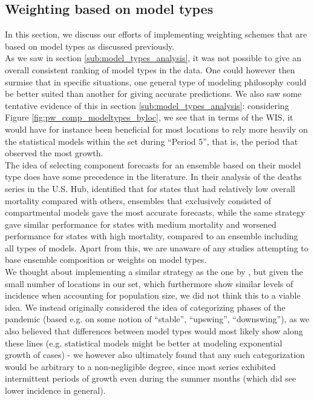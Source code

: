 \subsection{Weighting based on model types} \label{sub:weighting_based_on_model_types}
In this section, we discuss our efforts of implementing weighting schemes that are based on model types as discussed previously.\\
As we saw in section \ref{sub:model_types_analysis}, it was not possible to give an overall consistent ranking of model types in the data. One could however then surmise that in specific situations, one general type of modeling philosophy could be better suited than another for giving accurate predictions. We also saw some tentative evidence of this in section \ref{sub:model_types_analysis}: considering Figure \ref{fig:pw_comp_modeltypes_byloc}, we see that in terms of the WIS, it would have for instance been beneficial for most locations to rely more heavily on the statistical models within the set during ``Period 5'', that is, the period that observed the most growth.\\
The idea of selecting component forecasts for an ensemble based on their model type does have some precedence in the literature. In their analysis of the deaths series in the U.S. Hub, \cite{taylor_combining_2021} identified that for states that had relatively low overall mortality compared with others, ensembles that exclusively consisted of compartmental models gave the most accurate forecasts, while the same strategy gave similar performance for states with medium mortality and worsened performance for states with high mortality, compared to an ensemble including all types of models. Apart from this, 
we are unaware of any studies attempting to base ensemble composition or weights on model types.\\
We thought about implementing a similar strategy as the one by \cite{taylor_combining_2021}, but given the small number of locations in our set, which furthermore show similar levels of incidence when accounting for population size, we did not think this to a viable idea. We instead originally considered the idea of categorizing phases of the pandemic (based e.g. on some notion of ``stable'', ``upswing'', ``downswing''), as we also believed that differences between model types would most likely show along these lines (e.g. statistical models might be better at modeling exponential growth of cases) - we however also ultimately found that any such categorization would be arbitrary to a non-negligible degree, since most series exhibited intermittent periods of growth even during the summer months (which did see lower incidence in general).\\

